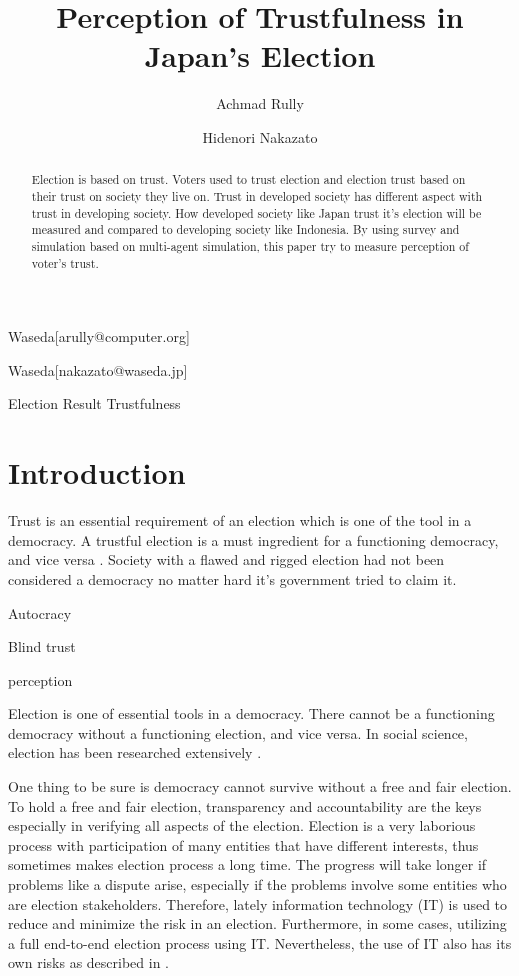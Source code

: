 \documentclass[JIP]{ipsj}
\begin{document}
\title{Perception of Trustfulness in Japan's Election}


\author{Achmad Rully}{Waseda}[arully@computer.org]
\author{Hidenori Nakazato}{Waseda}[nakazato@waseda.jp]


\begin{abstract}
Election is based on trust. Voters used to trust election and election trust based on their trust on society they live on. Trust in developed society has different aspect with trust in developing society. How developed society like Japan trust it's election will be measured and compared to developing society like Indonesia. By using survey and simulation based on multi-agent simulation, this paper try to measure perception of voter's trust.
\end{abstract}

\begin{keyword}
Election Result Trustfulness
\end{keyword}

\maketitle

\section{Introduction}
Trust is an essential requirement of an election which is one of the tool in a democracy. A trustful election is a must ingredient for a functioning democracy, and vice versa \cite{Manan2010}. Society with a flawed and rigged election had not been considered a democracy no matter hard it's government tried to claim it.

Autocracy

Blind trust 

perception







Election is one of essential tools in a democracy. There cannot be a functioning democracy without a functioning election, and vice versa. In social science, election has been researched extensively \cite{Manan2010}.

One thing to be sure is democracy cannot survive without a free and fair election. To hold a free and fair election, transparency and accountability are the keys especially in verifying all aspects of the election. Election is a very laborious process with participation of many entities that have different interests, thus sometimes makes election process a long time. The progress will take longer if problems like a dispute arise, especially if the problems involve some entities who are election stakeholders. Therefore, lately information technology (IT) is used to reduce and minimize the risk in an election. Furthermore, in some cases, utilizing a full end-to-end election process using IT. Nevertheless, the use of IT also has its own risks as described in \cite{Neumann1995}.
\end{document}
